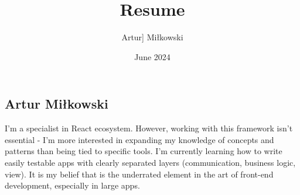 \documentclass{my_cv}
\title{Resume}
\author{Artur] Miłkowski}
\date{June 2024}
\begin{document}
\begin{multicols}{3}
    \section{}
    \columnbreak
    \section{}
    \columnbreak
    \section{ }
\end{multicols}

\begin{multicols}{2}
    \section{\Huge \textbf{Artur \newline Miłkowski}}

    \columnbreak
    \begin{spacing}{1.5}
        I’m a specialist in React ecosystem. However, working with this framework isn’t essential - I’m more interested in expanding my knowledge of concepts and patterns than being tied to specific tools. I’m currently learning how to write easily testable apps with clearly separated layers (communication, business logic, view). It is my belief that is the underrated element in the art of front-end development, especially in large apps.
    \end{spacing}
\end{multicols}

\vspace{1em}
\setlength{\columnsep}{1cm}
\end{document}

